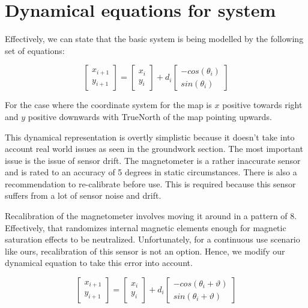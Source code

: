 \section{Dynamical equations for system}

Effectively, we can state that the basic system is being modelled by the
following set of equations:

\begin{equation}\label{eq:dr_eq}
\begin{bmatrix}x_{i+1}\\
y_{i+1}
\end{bmatrix} = \begin{bmatrix}x_{i}\\
y_{i}
\end{bmatrix}  + d{}_{i} \begin{bmatrix}-cos(\theta_{i})\\
sin(\theta_{i})
\end{bmatrix} 
\end{equation}

For the case where the coordinate system for the map is $x$ positive towards
right and $y$ positive downwards with TrueNorth of the map pointing upwards.

This dynamical representation is overtly simplistic because it doesn't take into
account real world issues as seen in the groundwork section. The most important
issue is the issue of sensor drift. The magnetometer is a rather inaccurate
sensor and is rated to an accuracy of 5 degrees in static circumstances. There
is also a recommendation to re-calibrate before use. This is required because
this sensor suffers from a lot of sensor noise and drift. 

Recalibration of the magnetometer involves moving it around in a pattern of 8.
Effectively, that randomizes internal magnetic elements enough for magnetic
saturation effects to be neutralized. Unfortunately, for a continuous use
scenario like ours, recalibration of this sensor is not an option. Hence, we
modify our dynamical equation to take this error into account.

\begin{equation}
\begin{bmatrix}x_{i+1}\\
y_{i+1}
\end{bmatrix} = \begin{bmatrix}x_{i}\\
y_{i}
\end{bmatrix}  + d{}_{i} \begin{bmatrix}-cos(\theta_{i}+\vartheta)\\
sin(\theta_{i}+\vartheta)
\end{bmatrix} 
\end{equation}

